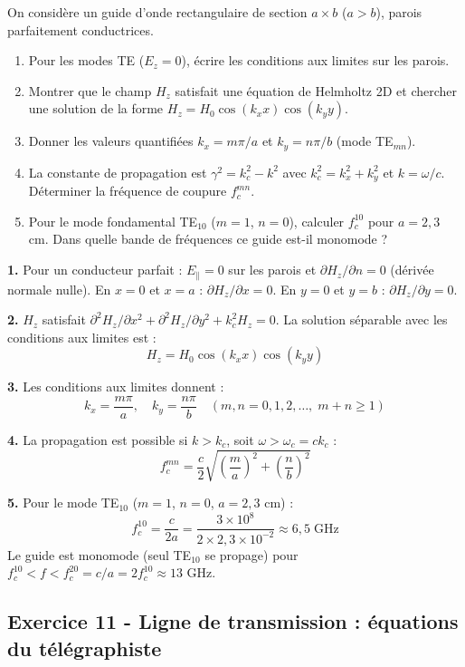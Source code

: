 \documentclass[12pt,a4paper]{article}
\begin{document}
\begin{boiteexercice}
On considère un guide d'onde rectangulaire de section $a\times b$ ($a>b$), parois parfaitement conductrices.
\begin{enumerate}
  \item Pour les modes TE ($E_z=0$), écrire les conditions aux limites sur les parois.
  \item Montrer que le champ $H_z$ satisfait une équation de Helmholtz 2D et chercher une solution de la forme $H_z = H_0\cos(k_x x)\cos(k_y y)$.
  \item Donner les valeurs quantifiées $k_x = m\pi/a$ et $k_y = n\pi/b$ (mode TE$_{mn}$).
  \item La constante de propagation est $\gamma^2 = k_c^2 - k^2$ avec $k_c^2 = k_x^2+k_y^2$ et $k = \omega/c$. Déterminer la fréquence de coupure $f_c^{mn}$.
  \item Pour le mode fondamental TE$_{10}$ ($m=1$, $n=0$), calculer $f_c^{10}$ pour $a = 2{,}3$ cm. Dans quelle bande de fréquences ce guide est-il monomode ?
\end{enumerate}
\end{boiteexercice}

\begin{boitecorrige}
\textbf{1.} Pour un conducteur parfait : $E_\parallel = 0$ sur les parois et $\partial H_z/\partial n = 0$ (dérivée normale nulle). En $x=0$ et $x=a$ : $\partial H_z/\partial x = 0$. En $y=0$ et $y=b$ : $\partial H_z/\partial y = 0$.

\textbf{2.} $H_z$ satisfait $\partial^2 H_z/\partial x^2 + \partial^2 H_z/\partial y^2 + k_c^2 H_z = 0$. La solution séparable avec les conditions aux limites est :
\[
H_z = H_0\cos(k_x x)\cos(k_y y)
\]

\textbf{3.} Les conditions aux limites donnent :
\[
k_x = \frac{m\pi}{a},\quad k_y = \frac{n\pi}{b}\quad (m,n = 0, 1, 2, \ldots,\; m+n\geq1)
\]

\textbf{4.} La propagation est possible si $k > k_c$, soit $\omega > \omega_c = ck_c$ :
\[
f_c^{mn} = \frac{c}{2}\sqrt{\left(\frac{m}{a}\right)^2+\left(\frac{n}{b}\right)^2}
\]

\textbf{5.} Pour le mode TE$_{10}$ ($m=1$, $n=0$, $a=2{,}3$ cm) :
\[
f_c^{10} = \frac{c}{2a} = \frac{3\times10^8}{2\times2{,}3\times10^{-2}}\approx 6{,}5\;\text{GHz}
\]
Le guide est monomode (seul TE$_{10}$ se propage) pour $f_c^{10} < f < f_c^{20} = c/a = 2f_c^{10}\approx13$ GHz.
\end{boitecorrige}

\subsection*{Exercice 11 - Ligne de transmission : équations du télégraphiste \niveau{\moyen}}
\end{document}
